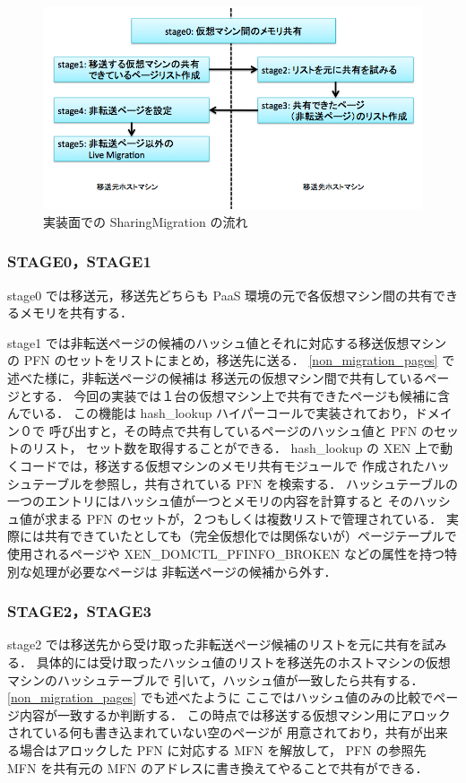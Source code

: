 \documentclass[graduation-thesis]{mlarticle}
\begin{document}
\begin{figure}[H]\begin{center}\includegraphics[width=12.0cm]{./img/sharing_migration_imp.png}\caption{ 実装面での SharingMigration の流れ}\label{sharing_migration_imp}\end{center}\end{figure}
\subsubsection{STAGE0，STAGE1}
\label{sec-5-3-2}
stage0 では移送元，移送先どちらも PaaS 環境の元で各仮想マシン間の共有できるメモリを共有する．

stage1 では非転送ページの候補のハッシュ値とそれに対応する移送仮想マシンの
PFN のセットをリストにまとめ，移送先に送る．
\ref{non_migration_pages} で述べた様に，非転送ページの候補は
移送元の仮想マシン間で共有しているページとする．
今回の実装では１台の仮想マシン上で共有できたページも候補に含んでいる．
この機能は hash\_lookup ハイパーコールで実装されており，ドメイン０で
呼び出すと，その時点で共有しているページのハッシュ値と PFN のセットのリスト，
セット数を取得することができる．
hash\_lookup の XEN 上で動くコードでは，移送する仮想マシンのメモリ共有モジュールで
作成されたハッシュテーブルを参照し，共有されている PFN を検索する．
ハッシュテーブルの一つのエントリにはハッシュ値が一つとメモリの内容を計算すると
そのハッシュ値が求まる PFN のセットが，２つもしくは複数リストで管理されている．
実際には共有できていたとしても（完全仮想化では関係ないが）ページテープルで使用されるページや
XEN\_DOMCTL\_PFINFO\_BROKEN などの属性を持つ特別な処理が必要なページは
非転送ページの候補から外す．
\subsubsection{STAGE2，STAGE3}
\label{sec-5-3-3}
stage2 では移送先から受け取った非転送ページ候補のリストを元に共有を試みる．
具体的には受け取ったハッシュ値のリストを移送先のホストマシンの仮想マシンのハッシュテーブルで
引いて，ハッシュ値が一致したら共有する．\ref{non_migration_pages} でも述べたように
ここではハッシュ値のみの比較でページ内容が一致するか判断する．
この時点では移送する仮想マシン用にアロックされている何も書き込まれていない空のページが
用意されており，共有が出来る場合はアロックした PFN に対応する MFN を解放して，
PFN の参照先 MFN を共有元の MFN のアドレスに書き換えてやることで共有ができる．
\end{document}
